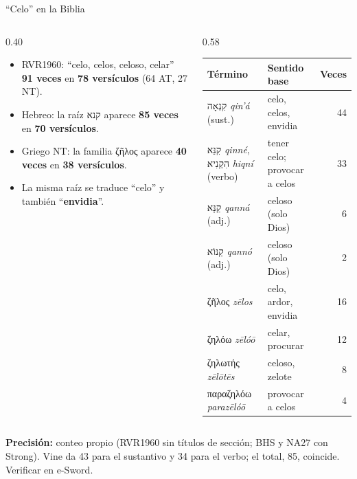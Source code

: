 \documentclass[hyperref={bookmarks=false},aspectratio=169]{beamer}
\newcommand{\heb}[1]{\mbox{\foreignlanguage{hebrew}{#1}}}
\newcommand{\grc}[1]{\foreignlanguage{ancientgreek}{#1}}
\newcommand{\destacar}[1]{\textbf{\textcolor{azul}{#1}}}
\newcommand{\precision}[1]{{\footnotesize\color{gris}\textbf{Precisión:} #1}}
\begin{document}
\begin{frame}{``Celo'' en la Biblia}
\begin{columns}[c,onlytextwidth]
\begin{column}{0.40\textwidth}\footnotesize
\begin{itemize}
\item RVR1960: ``celo, celos, celoso, celar'' \textbf{91 veces} en \textbf{78 versículos} (64 AT, 27 NT).
\item Hebreo: la raíz \heb{קנא} aparece \textbf{85 veces} en \textbf{70 versículos}.
\item Griego NT: la familia \grc{ζῆλος} aparece \textbf{40 veces} en \textbf{38 versículos}.
\item La misma raíz se traduce ``celo'' y también ``\destacar{envidia}''.
\end{itemize}
\end{column}
\begin{column}{0.58\textwidth}
\scriptsize\renewcommand{\arraystretch}{1.12}
\begin{tabular}{@{}>{\RaggedRight\arraybackslash}p{3.5cm}>{\RaggedRight\arraybackslash}p{2.3cm}r@{}}
\toprule
\textbf{Término} & \textbf{Sentido base} & \textbf{Veces} \\ \midrule
\heb{קִנְאָה} \emph{qin'á} (sust.) & celo, celos, envidia & 44 \\
\heb{קִנֵּא} \emph{qinné}, \heb{הִקְנִיא} \emph{hiqní} (verbo) & tener celo; provocar a celos & 33 \\
\heb{קַנָּא} \emph{qanná} (adj.) & celoso (solo Dios) & 6 \\
\heb{קַנּוֹא} \emph{qannó} (adj.) & celoso (solo Dios) & 2 \\ \midrule
\grc{ζῆλος} \emph{zēlos} & celo, ardor, envidia & 16 \\
\grc{ζηλόω} \emph{zēlóō} & celar, procurar & 12 \\
\grc{ζηλωτής} \emph{zēlōtēs} & celoso, zelote & 8 \\
\grc{παραζηλόω} \emph{parazēlóō} & provocar a celos & 4 \\
\bottomrule
\end{tabular}
\end{column}
\end{columns}\par\smallskip
\precision{conteo propio (RVR1960 sin títulos de sección; BHS y NA27 con Strong). Vine da 43 para el sustantivo y 34 para el verbo; el total, 85, coincide. Verificar en e-Sword.}
\end{frame}
\end{document}
